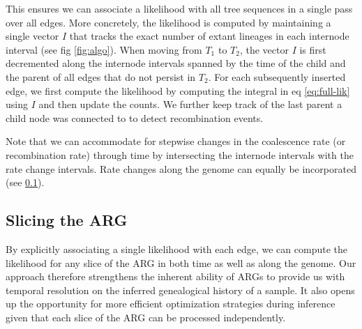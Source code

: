 \documentclass{article}
\newcommand{\argweaver}[0]{\texttt{ARGweaver}}
\begin{document}
This ensures we can associate a likelihood
with all tree sequences in a single pass over all edges.
More concretely, the likelihood is computed by maintaining a single vector $I$ that tracks
the exact number of extant lineages in each internode interval (see fig \ref{fig:algo}).
When moving from $T_1$ to $T_2$, the vector $I$ is first decremented along the internode intervals
spanned by the time of the child and the parent of all edges that do not persist in $T_2$.
For each subsequently inserted edge, we first compute the likelihood by computing the integral
in eq \ref{eq:full-lik} using $I$ and then update the counts. We further keep track of
the last parent a child node was connected to to detect recombination events.

Note that we can accommodate for stepwise changes in the coalescence rate (or recombination rate)
through time by intersecting the internode intervals with the rate change intervals.
Rate changes along the genome can equally be incorporated (see \ref{sec:slicing}).




\subsection{Slicing the ARG} \label{sec:slicing}

By explicitly associating a single likelihood with each edge,
we can compute the likelihood for any slice of the ARG in both
time as well as along the genome. Our approach therefore strengthens
the inherent ability of ARGs to provide us with temporal
resolution on the inferred genealogical history of a sample.
It also opens up the opportunity for more efficient optimization
strategies during inference given that each slice of the ARG can be
processed independently.
\end{document}
